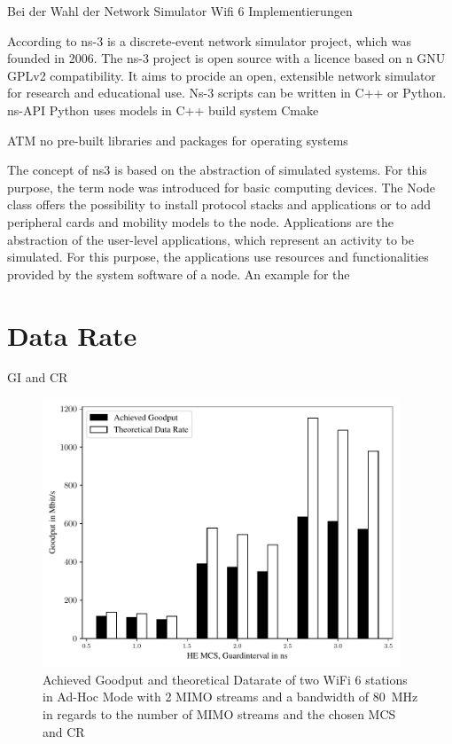 \documentclass[]{nsm-thesis}
\begin{document}
Bei der Wahl der Network Simulator Wifi 6 Implementierungen 



According to \cite{ns3manual} ns-3 is a discrete-event network simulator project, which was founded in 2006. The ns-3 project is open source with a licence based on n GNU GPLv2 compatibility. It aims to procide an open, extensible network simulator for research and educational use. Ns-3 scripts can be written in C++ or Python.
ns-API Python uses models in C++
build system Cmake

ATM no pre-built libraries and packages for operating systems
 
The concept of ns3 is based on the abstraction of simulated systems. For this purpose, the term node was introduced for basic computing devices. The Node class offers the possibility to install protocol stacks and applications or to add peripheral cards and mobility models to the node.
Applications are the abstraction of the user-level applications, which represent an activity to be simulated. For this purpose, the applications use resources and functionalities provided by the system software of a node. An example for the 


\section{Data Rate}


\ac{GI} and \ac{CR}
\begin{figure}%
	\centering
	\includegraphics[width=0.95\textwidth]{figures/gi_dataRate_simulation.pdf}
	\caption{Achieved Goodput and theoretical Datarate of two WiFi 6 stations in Ad-Hoc Mode with \num{2} \ac{MIMO} streams and a bandwidth of \SI{80}{\mega\hertz} in regards to the number of \ac{MIMO} streams and the chosen \ac{MCS} and \ac{CR}}%
	\label{fig:Data_rate_GI}%
\end{figure}
\end{document}
